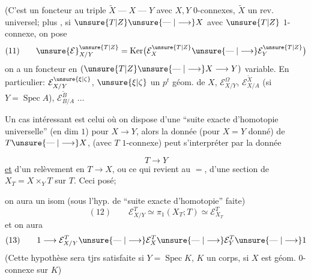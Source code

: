 
(C'est un foncteur  au triple $\widetilde X\mathrel{\text{---}}X\mathrel{\text{---}}Y$ avec $X,Y$ $0$-connexes, $\widetilde X$ un rev. universel; plus , si $\unsure{T|Z}\unsure{\mathrel{\text{---}}|\longrightarrow}X$ avec $\unsure{T|Z}$ $1$-connexe, on pose
\[
(11)\qquad \unsure{\mathcal E}_{X/Y}^{\unsure{T|Z}}=\operatorname{Ker}\bigl(\mathcal E_X^{\unsure{T|Z}}\unsure{\mathrel{\text{---}}|\longrightarrow}\mathcal E_Y^{\unsure{T|Z}}\bigr)
\]
on a un foncteur en  $(\unsure{T|Z}\unsure{\mathrel{\text{---}}|\longrightarrow}X\longrightarrow Y)$ variable. En particulier: $\mathcal E_{X/Y}^{\unsure{\xi|\zeta}}$, $\unsure{\xi|\zeta}$ un $p^t$ géom. de $X$, $\mathcal E_{X/Y}^{\Omega}$, $\mathcal E_{X/A}^{\widetilde X}$ (si $Y=\operatorname{Spec} A$), $\mathcal E_{B/A}^{\widetilde B}$ $\ldots$


Un cas intéressant est celui où on dispose d'une ``suite exacte d'homotopie universelle''  (en dim $1$) pour $X\longrightarrow Y$, alors la donnée (pour $X=Y$ donné) de $T\unsure{\mathrel{\text{---}}|\longrightarrow}X$, (avec $T$ $1$-connexe) peut s'interpréter par la donnée  


\[
T\longrightarrow Y
\]
\uline{et} d'un relèvement en $T\longrightarrow X$, ou ce qui revient au $=$, d'une section de $X_T=X\times_YT$ sur $T$. Ceci posé;


on aura un isom  (sous l'hyp. de ``suite exacte d'homotopie'' faite)
\[
(12)\qquad \mathcal E_{X/Y}^T\simeq\pi_1(X_T;T)\simeq\mathcal E_{X_T}^T
\]
et on aura
\[
(13)\qquad 1\longrightarrow\mathcal E_{X/Y}^T\unsure{\mathrel{\text{---}}|\longrightarrow}\mathcal E_X^T\unsure{\mathrel{\text{---}}|\longrightarrow}\mathcal E_Y^T\unsure{\mathrel{\text{---}}|\longrightarrow}1
\]
(Cette hypothèse sera tjrs satisfaite si $Y=\operatorname{Spec}K$, $K$ un corps, si $X$ est géom. $0$-connexe sur $K$)


